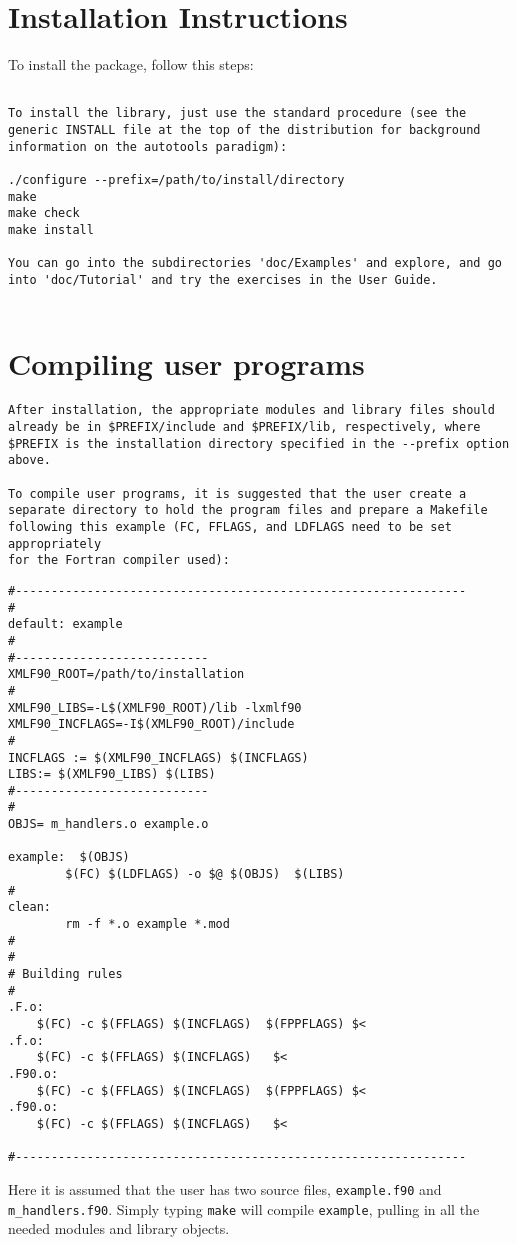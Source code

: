 \documentclass[11pt]{article}
\begin{document}
\newpage
\section{Installation Instructions}
%
To install the package, follow this steps:

\begin{verbatim}

To install the library, just use the standard procedure (see the
generic INSTALL file at the top of the distribution for background
information on the autotools paradigm):

./configure --prefix=/path/to/install/directory
make
make check
make install

You can go into the subdirectories 'doc/Examples' and explore, and go
into 'doc/Tutorial' and try the exercises in the User Guide.


\end{verbatim}
%
\section{Compiling user programs}
\label{sec:compiling}

\begin{verbatim}
After installation, the appropriate modules and library files should
already be in $PREFIX/include and $PREFIX/lib, respectively, where
$PREFIX is the installation directory specified in the --prefix option
above.

To compile user programs, it is suggested that the user create a
separate directory to hold the program files and prepare a Makefile
following this example (FC, FFLAGS, and LDFLAGS need to be set appropriately
for the Fortran compiler used):
\end{verbatim}

\begin{lstlisting}
#---------------------------------------------------------------
#
default: example
#
#---------------------------
XMLF90_ROOT=/path/to/installation
#
XMLF90_LIBS=-L$(XMLF90_ROOT)/lib -lxmlf90
XMLF90_INCFLAGS=-I$(XMLF90_ROOT)/include
#
INCFLAGS := $(XMLF90_INCFLAGS) $(INCFLAGS)
LIBS:= $(XMLF90_LIBS) $(LIBS)
#---------------------------
#
OBJS= m_handlers.o example.o
     
example:  $(OBJS)
        $(FC) $(LDFLAGS) -o $@ $(OBJS)  $(LIBS)
#
clean: 
        rm -f *.o example *.mod
#
#
# Building rules
#
.F.o:
	$(FC) -c $(FFLAGS) $(INCFLAGS)  $(FPPFLAGS) $<
.f.o:
	$(FC) -c $(FFLAGS) $(INCFLAGS)   $<
.F90.o:
	$(FC) -c $(FFLAGS) $(INCFLAGS)  $(FPPFLAGS) $<
.f90.o:
	$(FC) -c $(FFLAGS) $(INCFLAGS)   $<

#---------------------------------------------------------------
\end{lstlisting}
%
Here it is assumed that the user has two source files,
\texttt{example.f90} and \texttt{m\_handlers.f90}. Simply typing
\texttt{make} will compile \texttt{example}, pulling in all the needed
modules and library objects.
\end{document}
